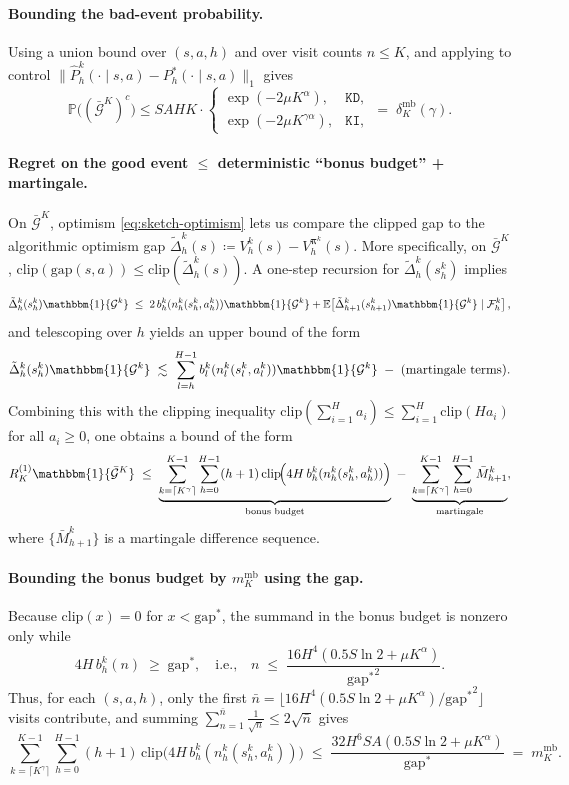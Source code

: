 \documentclass[11pt]{article}
\newcommand{\pii}{\boldsymbol{\pi}}
\newcommand{\E} {\mathbb{E}}
\newcommand{\PP}{\mathbb{P}}
\newcommand{\KD} {\texttt{KD}}
\newcommand{\KI} {\texttt{KI}}
\newcommand{\Dvk}{\tilde{\Delta}}
\newcommand{\Dvm}{\bar{M}}
\newcommand{\clip}{\mathrm{clip}}
\newcommand{\gap}{\mathrm{gap}}
\newcommand{\gapstar}{\mathrm{gap}^*}
\begin{document}
\paragraph{Bounding the bad-event probability.}
Using a union bound over $(s,a,h)$ and over visit counts $n\le K$, and applying
\cite[Theorem 2.1]{weissman2003inequalities} to control
$\|\hat P_h^k(\cdot\mid s,a)-P_h^*(\cdot\mid s,a)\|_1$ gives
\[
\PP\big((\bar{\mathcal{G}}^K)^c\big)
\le
SAHK\cdot
\begin{cases}
\exp(-2\mu K^\alpha), & \KD,\\
\exp(-2\mu K^{\gamma\alpha}), & \KI,
\end{cases}
\;=\;
\delta_K^{\mathrm{mb}}(\gamma).
\]

\paragraph{Regret on the good event $\leq$ deterministic ``bonus budget'' + martingale.}
On $\bar{\mathcal{G}}^K$, optimism \eqref{eq:sketch-optimism} lets us compare the clipped gap
to the algorithmic optimism gap $\Dvk_h^k(s)\coloneqq V_h^k(s)-V_h^{\pii^k}(s)$. More specifically, on $\bar{\mathcal{G}}^K$, $\clip(\gap(s,a))\leq \clip(\Dvk_h^k(s))$. A one-step recursion for $\Dvk_h^k(s_h^k)$ implies
\[
\Dvk_h^k(s_h^k)\mathbbm{1}\{\mathcal{G}^k\}
\;\le\;
2\,b_h^k(n_h^k(s_h^k,a_h^k))\mathbbm{1}\{\mathcal{G}^k\}
+
\E\!\left[\Dvk_{h+1}^k(s_{h+1}^k)\mathbbm{1}\{\mathcal{G}^k\}\mid \mathcal{F}_h^k\right],
\]
and telescoping over $h$ yields an upper bound of the form
\[
\Dvk_h^k(s_h^k)\mathbbm{1}\{\mathcal{G}^k\}
\;\lesssim\;
\sum_{l=h}^{H-1} b_l^k(n_l^k(s_l^k,a_l^k))\mathbbm{1}\{\mathcal{G}^k\}
\;-\;(\text{martingale terms}).
\]
Combining this with the clipping inequality $\clip\!\left(\sum_{i=1}^H a_i\right)\le \sum_{i=1}^H \clip(Ha_i)$ for all $a_i\ge 0$, one obtains a bound of the form
\begin{equation}\label{eq:sketch-main-decomp}
R_K^{(1)}\mathbbm{1}\{\bar{\mathcal{G}}^K\}
\;\le\;
\underbrace{\sum_{k=\lceil K^\gamma\rceil}^{K-1}\sum_{h=0}^{H-1}(h+1)\,
\clip\!\Big(4H\,b_h^k(n_h^k(s_h^k,a_h^k))\Big)}_{\text{bonus budget}}
\;-\;
\underbrace{\sum_{k=\lceil K^\gamma\rceil}^{K-1}\sum_{h=0}^{H-1}\Dvm_{h+1}^k}_{\text{martingale}},
\end{equation}
where $\{\Dvm_{h+1}^k\}$ is a martingale difference sequence.

\paragraph{Bounding the bonus budget by $m_K^{\mathrm{mb}}$ using the gap.}
Because $\clip(x)=0$ for $x<\gapstar$, the summand in the bonus budget is nonzero only while
\[
4H\,b_h^k(n)\;\ge\;\gapstar,
\quad\text{i.e.,}\quad
n\;\leq\;\frac{16H^4(0.5S\ln2+\mu K^\alpha)}{{\gapstar}^2}.
\]
Thus, for each $(s,a,h)$, only the first $\bar n=\lfloor 16H^4(0.5S\ln2+\mu K^\alpha)/{\gapstar}^2\rfloor$ visits contribute,
and summing $\sum_{n=1}^{\bar n}\frac{1}{\sqrt{n}}\le 2\sqrt{\bar n}$ gives
\[
\sum_{k=\lceil K^\gamma\rceil}^{K-1}\sum_{h=0}^{H-1}(h+1)\,
\clip\!\Big(4H\,b_h^k(n_h^k(s_h^k,a_h^k))\Big)
\;\le\;
\frac{32H^6SA(0.5S\ln2+\mu K^\alpha)}{\gapstar}
\;=\;
m_K^{\mathrm{mb}}.
\]
\end{document}
